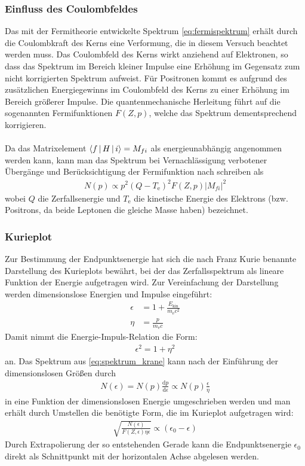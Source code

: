 \documentclass[11pt, a4paper]{article}
\numberwithin{equation}{section}
\begin{document}
\subsubsection{Einfluss des Coulombfeldes}
Das mit der Fermitheorie entwickelte Spektrum \eqref{eq:fermispektrum} erhält durch die Coulombkraft des Kerns eine Verformung, die in diesem Versuch beachtet werden muss.
Das Coulombfeld des Kerns wirkt anziehend auf Elektronen, so dass das Spektrum im Bereich kleiner Impulse eine Erhöhung im Gegensatz zum nicht korrigierten Spektrum aufweist. Für Positronen kommt es aufgrund des zusätzlichen Energiegewinns im Coulombfeld des Kerns zu einer Erhöhung im Bereich größerer Impulse.
Die quantenmechanische Herleitung führt auf die sogenannten Fermifunktionen $F(Z, p)$, welche das Spektrum dementsprechend korrigieren.
\\
\\
Da das Matrixelement $\Braket{f|H|i}=M_{fi}$ als energieunabhängig angenommen werden kann, kann man das Spektrum bei Vernachlässigung verbotener Übergänge und Berücksichtigung der Fermifunktion nach \cite{krane} schreiben als
\begin{align}
	N(p) \propto p^2 \left( Q - T_\mathrm{e} \right)^2 F(Z, p) \left| M_{fi} \right|^2
	\label{eq:spektrum_krane}
\end{align}
wobei $Q$ die Zerfallsenergie und $T_\mathrm{e}$ die kinetische Energie des Elektrons (bzw. Positrons, da beide Leptonen die gleiche Masse haben) bezeichnet.

\subsubsection{Kurieplot}
\label{sssec:kurieplot}
Zur Bestimmung der Endpunktsenergie hat sich die nach Franz Kurie benannte Darstellung des Kurieplots bewährt, bei der das Zerfallsspektrum als lineare Funktion der Energie aufgetragen wird.
Zur Vereinfachung der Darstellung werden dimensionslose Energien und Impulse eingeführt:
\begin{align}
	\epsilon &= 1 + \frac{E_\mathrm{kin}}{m_\mathrm{e} c^2} \\
	\eta &= \frac{p}{m_\mathrm{e} c} \label{eq:eta}
\end{align}
Damit nimmt die Energie-Impuls-Relation die Form:
\begin{align}
\epsilon^2 = 1 + \eta^2
\label{eq:energie_impuls_rel}
\end{align}
an.
Das Spektrum aus \eqref{eq:spektrum_krane} kann nach der Einführung der dimensionslosen Größen durch
\begin{align}
N(\epsilon) = N(p) \frac{\mathrm{d}p}{\mathrm{d}\epsilon}\propto N(p) \frac{\epsilon}{\eta}
\end{align}
in eine Funktion der dimensionslosen Energie umgeschrieben werden und man erhält durch Umstellen die benötigte Form, die im Kurieplot aufgetragen wird:
\begin{align}
	\sqrt{\frac{N(\epsilon)}{F(Z,\epsilon) \eta \epsilon}} \propto (\epsilon_0 - \epsilon)
\end{align}
Durch Extrapolierung der so entstehenden Gerade kann die Endpunktsenergie $\epsilon_0$ direkt als Schnittpunkt mit der horizontalen Achse abgelesen werden.
\end{document}

